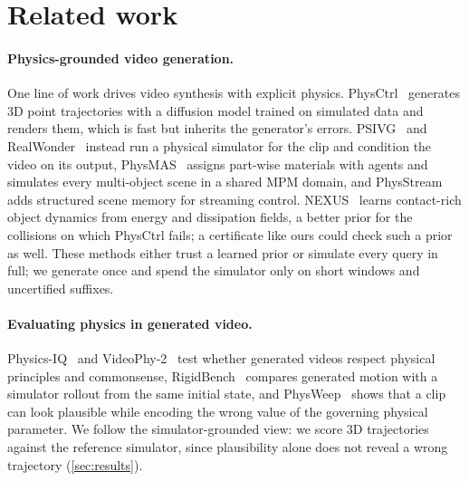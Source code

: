 \section{Related work}
\label{sec:related}

\paragraph{Physics-grounded video generation.}
One line of work drives video synthesis with explicit physics.
PhysCtrl~\cite{wang2025physctrl} generates 3D point trajectories with a diffusion model trained on simulated data and renders them, which is fast but inherits the generator's errors.
PSIVG~\cite{foo2026physical} and RealWonder~\cite{liu2026realwonder} instead run a physical simulator for the clip and condition the video on its output, PhysMAS~\cite{qin2026physmas} assigns part-wise materials with agents and simulates every multi-object scene in a shared MPM domain, and PhysStream~\cite{chen2026physstream} adds structured scene memory for streaming control.
NEXUS~\cite{ying2026nexus} learns contact-rich object dynamics from energy and dissipation fields, a better prior for the collisions on which PhysCtrl fails; a certificate like ours could check such a prior as well.
These methods either trust a learned prior or simulate every query in full; we generate once and spend the simulator only on short windows and uncertified suffixes.

\paragraph{Evaluating physics in generated video.}
Physics-IQ~\cite{motamed2025do} and VideoPhy-2~\cite{bansal2025videophy} test whether generated videos respect physical principles and commonsense, RigidBench~\cite{jain2026rigidbench} compares generated motion with a simulator rollout from the same initial state, and PhysWeep~\cite{khanbayov2026physweep} shows that a clip can look plausible while encoding the wrong value of the governing physical parameter.
We follow the simulator-grounded view: we score 3D trajectories against the reference simulator, since plausibility alone does not reveal a wrong trajectory (\cref{sec:results}).

